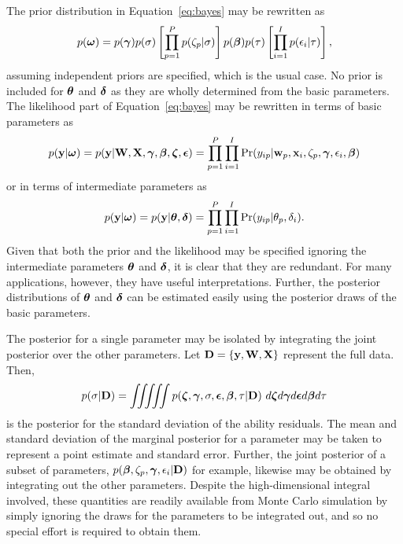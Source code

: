 \documentclass[12pt, letterpaper]{article}
\begin{document}
The prior distribution in Equation~\ref{eq:bayes} may be rewritten as
\begin{equation} \label{eq:prior}
	p(\boldsymbol{\omega}) =
	p(\boldsymbol{\gamma}) p(\sigma)
	\left [ 
		\prod_{p=1}^P p(\zeta_p | \sigma) 
	\right ]
	p(\boldsymbol{\beta}) p(\tau)
	\left [ 
		\prod_{i=1}^I p(\epsilon_i | \tau) 
	\right ]
,\end{equation}
assuming independent priors are specified, which is the usual case. No prior is included for $\boldsymbol{\theta}$ and $\boldsymbol{\delta}$ as they are wholly determined from the basic parameters. 
The likelihood part of Equation~\ref{eq:bayes} may be rewritten in terms of basic parameters as
\begin{equation} \label{eq:bayes-likelihood-alt}
	p(\mathbf{y} | \boldsymbol{\omega}) =
	p(\mathbf{y} | \mathbf{W}, \mathbf{X}, \boldsymbol{\gamma}, \boldsymbol{\beta}, \boldsymbol{\zeta}, \boldsymbol{\epsilon}) =
	\prod_{p=1}^P \prod_{i=1}^I 
	\Pr({y_{ip}} | \mathbf{w}_p, \mathbf{x}_i, \zeta_p, \boldsymbol{\gamma}, \epsilon_i, \boldsymbol{\beta})
\end{equation}
or in terms of intermediate parameters as
\begin{equation} \label{eq:bayes-likelihood}
	p(\mathbf{y} | \boldsymbol{\omega}) =
	p(\mathbf{y} | \boldsymbol{\theta}, \boldsymbol{\delta}) =
	\prod_{p=1}^P \prod_{i=1}^I \Pr({y_{ip}} | \theta_p, \delta_i)
.\end{equation}
Given that both the prior and the likelihood may be specified ignoring the intermediate parameters $\boldsymbol{\theta}$ and $\boldsymbol{\delta}$, it is clear that they are redundant. For many applications, however, they have useful interpretations. Further, the posterior distributions of $\boldsymbol{\theta}$ and $\boldsymbol{\delta}$ can be estimated easily using the posterior draws of the basic parameters.


The posterior for a single parameter may be isolated by integrating the joint posterior over the other parameters. Let $\mathbf{D} = \{ \mathbf{y}, \mathbf{W}, \mathbf{X} \}$ represent the full data. Then,
\begin{equation}
	p(\sigma | \D) = 
	\int \!\!\! \int \!\!\! \int \!\!\! \int \!\!\! \int
		p(\vzeta, \vgamma, \sigma, \vepsilon, \vbeta, \tau | \D) 
	~d \vzeta d \vgamma d \vepsilon d \vbeta d \tau
\end{equation}
is the posterior for the standard deviation of the ability residuals. The mean and standard deviation of the marginal posterior for a parameter may be taken to represent a point estimate and standard error. Further, the joint posterior of a subset of parameters, $p(\boldsymbol{\beta}, \zeta_p, \boldsymbol{\gamma}, \epsilon_i | \mathbf{D})$ for example, likewise may be obtained by integrating out the other parameters. Despite the high-dimensional integral involved, these quantities are readily available from Monte Carlo simulation by simply ignoring the draws for the parameters to be integrated out, and so no special effort is required to obtain them.
\end{document}
